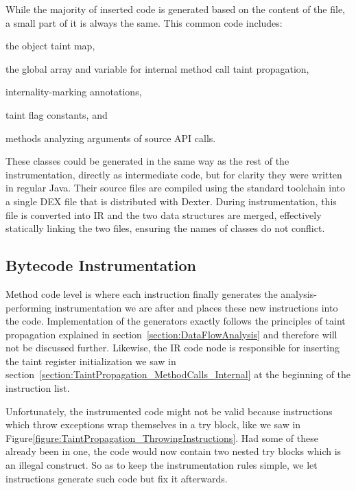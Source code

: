 \documentclass[12pt,twoside,notitlepage]{report}
\begin{document}
While the majority of inserted code is generated based on the content of the file, a small part of it is always the same. This common code includes:
\begin{inparaenum}[(i)]
\item the object taint map,
\item the global array and variable for internal method call taint propagation,
\item internality-marking annotations,
\item taint flag constants, and
\item methods analyzing arguments of source API calls.
\end{inparaenum}

These classes could be generated in the same way as the rest of the instrumentation, directly as intermediate code, but for clarity they were written in regular Java. Their source files are compiled using the standard toolchain into a single DEX file that is distributed with Dexter. During instrumentation, this file is converted into IR and the two data structures are merged, effectively statically linking the two files, ensuring the names of classes do not conflict.

\subsection{Bytecode Instrumentation}

Method code level is where each instruction finally generates the analysis-performing instrumentation we are after and places these new instructions into the code. Implementation of the generators exactly follows the principles of taint propagation explained in section~\ref{section:DataFlowAnalysis} and therefore will not be discussed further. Likewise, the IR code node is responsible for inserting the taint register initialization we saw in section~\ref{section:TaintPropagation_MethodCalls_Internal} at the beginning of the instruction list.

Unfortunately, the instrumented code might not be valid because instructions which throw exceptions wrap themselves in a try block, like we saw in Figure\ref{figure:TaintPropagation_ThrowingInstructions}. Had some of these already been in one, the code would now contain two nested try blocks which is an illegal construct. So as to keep the instrumentation rules simple, we let instructions generate such code but fix it afterwards.
\end{document}
